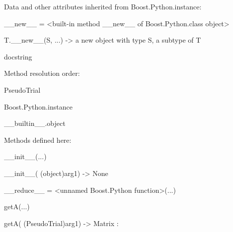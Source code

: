 \documentclass[letterpaper,10pt,english]{sphinxmanual}
\begin{document}
\begin{description}
\begin{description}
\begin{DUlineblock}{0em}
\item[] Data and other attributes inherited from Boost.Python.instance:
\item[] 
\item[] \_\_new\_\_ = \textless{}built-in method \_\_new\_\_ of Boost.Python.class object\textgreater{}
\item[]
\begin{DUlineblock}{\DUlineblockindent}
\item[] T.\_\_new\_\_(S, ...) -\textgreater{} a new object with type S, a subtype of T
\end{DUlineblock}
\end{DUlineblock}

\item[{class PseudoTrial(Boost.Python.instance)}] \leavevmode
\begin{DUlineblock}{0em}
\item[] docstring
\item[] 
\item[] Method resolution order:
\item[]
\begin{DUlineblock}{\DUlineblockindent}
\item[] PseudoTrial
\item[] Boost.Python.instance
\item[] \_\_builtin\_\_.object
\item[] 
\end{DUlineblock}
\item[] Methods defined here:
\item[] 
\item[] \_\_init\_\_(...)
\item[]
\begin{DUlineblock}{\DUlineblockindent}
\item[] \_\_init\_\_( (object)arg1) -\textgreater{} None
\item[] 
\end{DUlineblock}
\item[] \_\_reduce\_\_ = \textless{}unnamed Boost.Python function\textgreater{}(...)
\item[] 
\item[] getA(...)
\item[]
\begin{DUlineblock}{\DUlineblockindent}
\item[] getA( (PseudoTrial)arg1) -\textgreater{} Matrix :
\item[]
\begin{DUlineblock}{\DUlineblockindent}

\end{DUlineblock}
\end{DUlineblock}
\end{DUlineblock}
\end{description}
\end{description}
\end{document}
